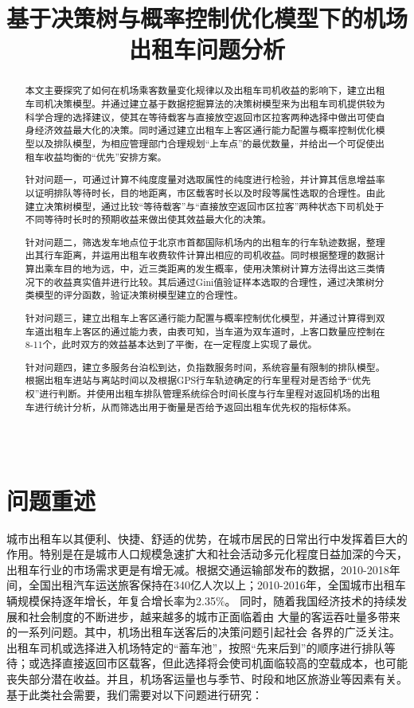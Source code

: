 \documentclass[withoutpreface,bwprint]{cumcmthesis} %
\title{基于决策树与概率控制优化模型下的机场出租车问题分析}
\begin{document}
 \maketitle
 \begin{abstract}
本文主要探究了如何在机场乘客数量变化规律以及出租车司机收益的影响下，建立出租车司机决策模型。并通过建立基于数据挖掘算法的决策树模型来为出租车司机提供较为科学合理的选择建议，使其在等待载客与直接放空返回市区拉客两种选择中做出可使自身经济效益最大化的决策。同时通过建立出租车上客区通行能力配置与概率控制优化模型以及排队模型，为相应管理部门合理规划“上车点”的最优数量，并给出一个可促使出租车收益均衡的“优先”安排方案。

针对问题一，可通过计算不纯度度量对选取属性的纯度进行检验，并计算其信息增益率以证明排队等待时长，目的地距离，市区载客时长以及时段等属性选取的合理性。由此建立决策树模型，通过比较“等待载客”与“直接放空返回市区拉客”两种状态下司机处于不同等待时长时的预期收益来做出使其效益最大化的决策。

针对问题二，筛选发车地点位于北京市首都国际机场内的出租车的行车轨迹数据，整理出其行车距离，并运用出租车收费软件计算出相应的司机收益。同时根据整理的数据计算出乘车目的地为远，中，近三类距离的发生概率，使用决策树计算方法得出这三类情况下的收益真实值并进行比较。其后通过Gini值验证样本选取的合理性，通过决策树分类模型的评分函数，验证决策树模型建立的合理性。

针对问题三，建立出租车上客区通行能力配置与概率控制优化模型，并通过计算得到双车道出租车上客区的通过能力表，由表可知，当车道为双车道时，上客口数量应控制在8-11个，此时双方的效益基本达到了平衡，在一定程度上实现了最优。

针对问题四，建立多服务台泊松到达，负指数服务时间，系统容量有限制的排队模型。根据出租车进站与离站时间以及根据GPS行车轨迹确定的行车里程对是否给予“优先权”进行判断。并使用出租车排队管理系统综合时间长度与行车里程对返回机场的出租车进行统计分析，从而筛选出用于衡量是否给予返回出租车优先权的指标体系。 \\ \\ \\

\end{abstract}



\section{问题重述}  
城市出租车以其便利、快捷、舒适的优势，在城市居民的日常出行中发挥着巨大的作用。特别是在是城市人口规模急速扩大和社会活动多元化程度日益加深的今天，出租车行业的市场需求更是有增无减。根据交通运输部发布的数据，2010-2018年间，全国出租汽车运送旅客保持在340亿人次以上；2010-2016年，全国城市出租车辆规模保持逐年增长，年复合增长率为2.35$\%$。
同时，随着我国经济技术的持续发展和社会制度的不断进步，越来越多的城市正面临着由 大量的客运吞吐量多带来的一系列问题。其中，机场出租车送客后的决策问题引起社会 各界的广泛关注。出租车司机或选择进入机场特定的“蓄车池”，按照“先来后到”的顺序进行排队等待；或选择直接返回市区载客，但此选择将会使司机面临较高的空载成本，也可能丧失部分潜在收益。并且，机场客运量也与季节、时段和地区旅游业等因素有关。基于此类社会需要，我们需要对以下问题进行研究：
\end{document}
